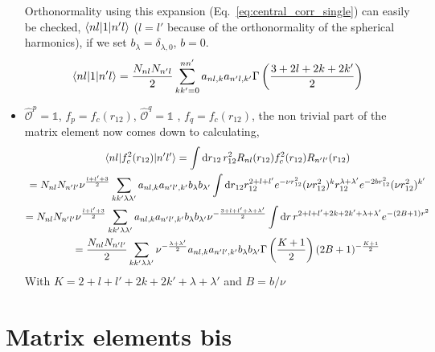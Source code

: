 \documentclass[10pt]{article}
\begin{document}
\begin{itemize}
	Orthonormality using this expansion (Eq.~\ref{eq:central_corr_single}) can easily be checked, $\braket{ n l |  1 | n' l}$ ($l=l'$ because of the orthonormality of the spherical harmonics), if we set $b_{\lambda} = \delta_{\lambda,0}$, $b=0$.
	\begin{align}
		\braket{ n l |  1 | n' l} =  \frac{N_{nl} N_{n'l}}{2}  \sum_{kk'=0}^{nn'} a_{nl,k} a_{n'l,k'} \Gamma \left( \frac{3+2l+2k + 2k'}{2} \right)
	\end{align}
	\item $\hat{\mathcal{O}}^{p} = \mathbb{1}$, $f_{p} = f_c(r_{12})$, $\hat{\mathcal{O}}^{q} = \mathbb{1}$ , $f_{q} = f_c(r_{12})$, the non trivial part of the matrix element now comes down to calculating,
	\begin{multline*}
		\braket{ n l |  f_{c}^{2}(r_{12}) | n' l'} = \int \text{d} r_{12} \, r_{12}^{2} R_{nl}(r_{12}) f_{c}^{2}(r_{12}) R_{n'l'}(r_{12}) \\
		= N_{nl} N_{n'l'} \nu^{\frac{l + l' + 3}{2}} \sum_{kk'\lambda \lambda'} a_{nl,k} a_{n'l',k'} b_{\lambda} b_{\lambda'}  \int \text{d} r_{12} r_{12}^{2+l+l'} e^{-\nu r_{12}^{2}} ( \nu r_{12}^{2} )^{k} r_{12}^{\lambda+\lambda'} e^{-2 b r_{12}^{2}} ( \nu r_{12}^{2})^{k'} \\
		= N_{nl} N_{n'l'} \nu^{\frac{l + l' + 3}{2}} \sum_{kk'\lambda \lambda'} a_{nl,k} a_{n'l',k'} b_{\lambda} b_{\lambda'} \nu^{- \frac{3 + l + l' + \lambda + \lambda'}{2}} \int \text{d} r \, r^{2+l+l'+2k+2k'+\lambda + \lambda'} e^{- ( 2B + 1) r^{2}} \\
		=  \frac{N_{nl} N_{n'l'}}{2} \sum_{kk'\lambda \lambda'} \nu^{ - \frac{\lambda + \lambda'}{2}} a_{nl,k} a_{n'l',k'} b_{\lambda} b_{\lambda'} \Gamma\left(\frac{K+1}{2}\right) (2B+1)^{-\frac{K+1}{2}}
	\end{multline*}
	With $K = 2+l+l'+2k+2k'+\lambda+\lambda'$ and $B = b/\nu$
\end{itemize}
\section{Matrix elements bis}
\end{document}
